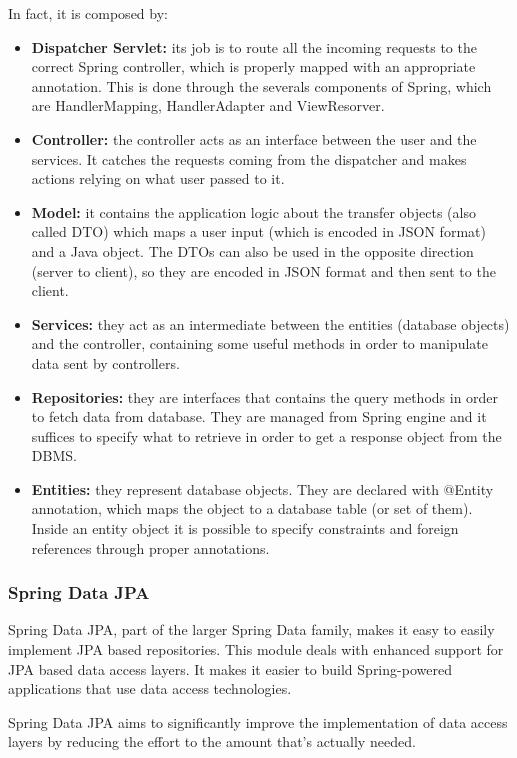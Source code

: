 \documentclass[table, 12pt]{article}
\begin{document}
In fact, it is composed by:
\begin{itemize}
    \item \textbf{Dispatcher Servlet:} its job is to route all the incoming requests to the correct Spring controller, which is properly mapped with an appropriate annotation. This is done through the severals components of Spring, which are HandlerMapping, HandlerAdapter and ViewResorver.
    \item \textbf{Controller:} the controller acts as an interface between the user and the services. It catches the requests coming from the dispatcher and makes actions relying on what user passed to it.
    \item \textbf{Model:} it contains the application logic about the transfer objects (also called DTO) which maps a user input (which is encoded in JSON format) and a Java object. The DTOs can also be used in the opposite direction (server to client), so they are encoded in JSON format and then sent to the client.
    \item \textbf{Services:} they act as an intermediate between the entities (database objects) and the controller, containing some useful methods in order to manipulate data sent by controllers.
    \item \textbf{Repositories:} they are interfaces that contains the query methods in order to fetch data from database. They are managed from Spring engine and it suffices to specify what to retrieve in order to get a response object from the DBMS.
    \item \textbf{Entities:} they represent database objects. They are declared with @Entity annotation, which maps the object to a database table (or set of them). Inside an entity object it is possible to specify constraints and foreign references through proper annotations.
\end{itemize}

\subsubsection{Spring Data JPA}
Spring Data JPA, part of the larger Spring Data family, makes it easy to easily implement JPA based repositories. This module deals with enhanced support for JPA based data access layers. It makes it easier to build Spring-powered applications that use data access technologies.

Spring Data JPA aims to significantly improve the implementation of data access layers by reducing the effort to the amount that’s actually needed.
\end{document}
